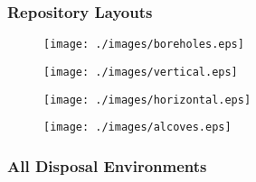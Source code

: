 \begin{frame}
  \frametitle{Repository Layouts}

  \begin{minipage}{0.49\textwidth}
    \begin{figure}[h!]
      \texttt{[image: ./images/boreholes.eps]}
    \end{figure}
    \begin{figure}[h!]
      \texttt{[image: ./images/vertical.eps]}
    \end{figure}
  \end{minipage}
  \hspace{0.01cm}
  \begin{minipage}{0.49\textwidth}
    \begin{figure}[h!]
      \texttt{[image: ./images/horizontal.eps]}
    \end{figure}
    \begin{figure}[h!]
      \texttt{[image: ./images/alcoves.eps]}
    \end{figure}
  \end{minipage}

\end{frame}

\begin{frame}[c]
  \frametitle{All Disposal Environments}
  
\end{frame}

